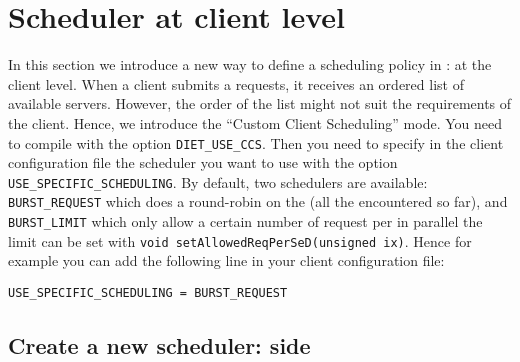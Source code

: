 
\section{Scheduler at client level}

In this section we introduce a new way to define a scheduling policy
in \diet: at the client level. When a client submits a requests, it
receives an ordered list of available servers. However, the order of
the list might not suit the requirements of the client. Hence, we
introduce the ``Custom Client Scheduling'' mode. You need to compile
\diet with the option \texttt{DIET\_USE\_CCS}. Then you need to specify
in the client configuration file the scheduler you want to use with
the option \texttt{USE\_SPECIFIC\_SCHEDULING}. By
default, two schedulers are available: \texttt{BURST\_REQUEST} which
does a round-robin on the \sed (all the encountered \sed so far), and
\texttt{BURST\_LIMIT} which only allow a certain number of request per
\sed in parallel the limit can be set with
\verb|void setAllowedReqPerSeD(unsigned ix)|.
Hence for example you can add the following line in your client
configuration file:
\begin{verbatim}
USE_SPECIFIC_SCHEDULING = BURST_REQUEST
\end{verbatim}



\subsection{Create a new scheduler: \diet side}


